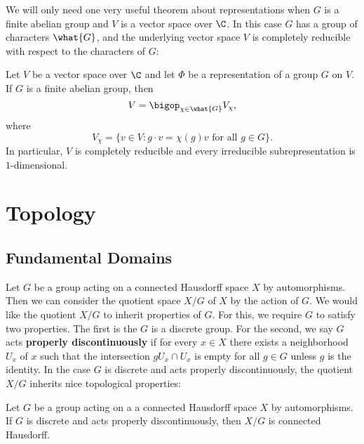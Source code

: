     We will only need one very useful theorem about representations when $G$ is a finite abelian group and $V$ is a vector space over $\C$. In this case $G$ has a group of characters $\what{G}$, and the underlying vector space $V$ is completely reducible with respect to the characters of $G$:

    \begin{theorem}\label{thm:finite_abelian_representation_is_completely_reducible}
      Let $V$ be a vector space over $\C$ and let $\Phi$ be a representation of a group $G$ on $V$. If $G$ is a finite abelian group, then
      \[
        V = \bigop_{\chi \in \what{G}}V_{\chi},
      \]
      where
      \[
        V_{\chi} = \{v \in V:g \cdot v = \chi(g)v \text{ for all } g \in G\}.
      \]
      In particular, $V$ is completely reducible and every irreducible subrepresentation is $1$-dimensional.
    \end{theorem}
\chapter{Topology}
  \section{Fundamental Domains}\label{append:Fundamental_Domains}
    Let $G$ be a group acting on a connected Hausdorff space $X$ by automorphisms. Then we can consider the quotient space $X/G$ of $X$ by the action of $G$. We would like the quotient $X/G$ to inherit properties of $G$. For this, we require $G$ to satisfy two properties. The first is the $G$ is a discrete group. For the second, we say $G$ acts \textbf{properly discontinuously} if for every $x \in X$ there exists a neighborhood $U_{x}$ of $x$ such that the intersection $gU_{x} \cap U_{x}$ is empty for all $g \in G$ unless $g$ is the identity. In the case $G$ is discrete and acts properly discontinuously, the quotient $X/G$ inherits nice topological properties:

    \begin{proposition}\label{prop:quotient_by_discrete_property_discontinuously}
      Let $G$ be a group acting on a a connected Hausdorff space $X$ by automorphisms. If $G$ is discrete and acts properly discontinuously, then $X/G$ is connected Hausdorff.
    \end{proposition}

